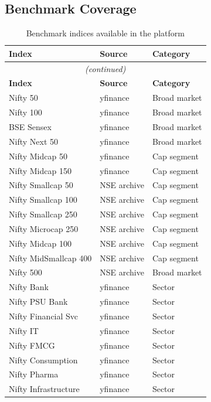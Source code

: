 \documentclass[12pt, a4paper]{article}
\begin{document}
\subsection{Benchmark Coverage}

\begin{longtable}{@{}p{}p{}p{}@{}}
\caption{Benchmark indices available in the platform}\label{tab:benchmarks}\\
\toprule
\textbf{Index} & \textbf{Source} & \textbf{Category} \\
\midrule
\endfirsthead
\multicolumn{3}{c}{\textit{(continued)}}\\
\toprule
\textbf{Index} & \textbf{Source} & \textbf{Category} \\
\midrule
\endhead
Nifty 50 & yfinance & Broad market \\
Nifty 100 & yfinance & Broad market \\
BSE Sensex & yfinance & Broad market \\
Nifty Next 50 & yfinance & Broad market \\
Nifty Midcap 50 & yfinance & Cap segment \\
Nifty Midcap 150 & yfinance & Cap segment \\
Nifty Smallcap 50 & NSE archive & Cap segment \\
Nifty Smallcap 100 & NSE archive & Cap segment \\
Nifty Smallcap 250 & NSE archive & Cap segment \\
Nifty Microcap 250 & NSE archive & Cap segment \\
Nifty Midcap 100 & NSE archive & Cap segment \\
Nifty MidSmallcap 400 & NSE archive & Cap segment \\
Nifty 500 & NSE archive & Broad market \\
Nifty Bank & yfinance & Sector \\
Nifty PSU Bank & yfinance & Sector \\
Nifty Financial Svc & yfinance & Sector \\
Nifty IT & yfinance & Sector \\
Nifty FMCG & yfinance & Sector \\
Nifty Consumption & yfinance & Sector \\
Nifty Pharma & yfinance & Sector \\
Nifty Infrastructure & yfinance & Sector \\

\end{longtable}
\end{document}
